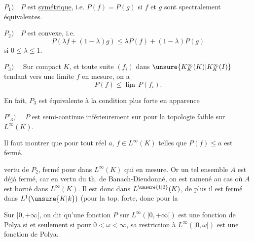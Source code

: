 
\(P_1)\quad P\) est \uline{symétrique}, i.e. \(P(f)=P(g)\) si \(f\) et \(g\) sont spectralement équivalentes.

\(P_2)\quad P\) est convexe, i.e.
\[
P(\lambda f+(1-\lambda)g)\le\lambda P(f)+(1-\lambda)P(g)
\]
si \(0\le\lambda\le1\).

\(P_3)\quad\) Sur  compact \(K\),  et toute suite \((f_i)\) dans \(\unsure{K^\infty_K(K)|K^\infty_K(I)}\) tendant vers une  limite \(f\) en mesure, on a
\[
P(f)\le\underline{\lim}\,P(f_i).
\]

En fait, \(P_3\) est équivalente à la condition plus forte en apparence

\(P'_3)\quad\)  \(P\) est semi-continue inférieurement sur  pour la topologie faible sur \(L^\infty(K)\).

Il faut montrer que pour tout réel \(a\), \deleted{\(\unsure{P^{-1}(]-\infty,a[)}\)}   \(f\in L^\infty(K)\) telles que \(P(f)\le a\) est  fermé.



 vertu de \(P_2\),   fermé pour  dans \(L^\infty(K)\) qui  en mesure. Or un tel ensemble \(A\) est déjà  fermé, car en vertu du th. de Banach-Dieudonné, on est ramené au cas où \(A\) est borné dans \(L^\infty(K)\). Il est donc  dans \(L^{\unsure{1|2}}(K)\),  de plus il est \uline{fermé} dans \(L^1(\unsure{K|k})\) (pour la top. forte, donc pour la


Sur \(]0,+\infty[\),  on dit qu'une fonction \(P\) sur \(L^\infty(]0,+\infty[)\) est une fonction de Polya si et seulement si pour  \(0<\omega<\infty\), sa restriction à \(L^\infty(]0,\omega[)\) est une fonction de Polya.

